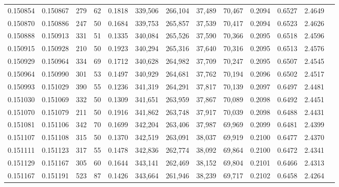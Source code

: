 \begin{tabular}{rrrrrrrrrrrrr}
0.150854 & 0.150867 &   279 &  62 &                                     0.1818 & 339,506 & 266,104 &  37,489 &  70,467 & 0.2094 & 0.6527 & 2.4649 \\
0.150870 & 0.150886 &   247 &  50 &                                     0.1684 & 339,753 & 265,857 &  37,539 &  70,417 & 0.2094 & 0.6523 & 2.4626 \\
0.150888 & 0.150913 &   331 &  51 &                                     0.1335 & 340,084 & 265,526 &  37,590 &  70,366 & 0.2095 & 0.6518 & 2.4596 \\
0.150915 & 0.150928 &   210 &  50 &                                     0.1923 & 340,294 & 265,316 &  37,640 &  70,316 & 0.2095 & 0.6513 & 2.4576 \\
0.150929 & 0.150964 &   334 &  69 &                                     0.1712 & 340,628 & 264,982 &  37,709 &  70,247 & 0.2095 & 0.6507 & 2.4545 \\
0.150964 & 0.150990 &   301 &  53 &                                     0.1497 & 340,929 & 264,681 &  37,762 &  70,194 & 0.2096 & 0.6502 & 2.4517 \\
0.150993 & 0.151029 &   390 &  55 &                                     0.1236 & 341,319 & 264,291 &  37,817 &  70,139 & 0.2097 & 0.6497 & 2.4481 \\
0.151030 & 0.151069 &   332 &  50 &                                     0.1309 & 341,651 & 263,959 &  37,867 &  70,089 & 0.2098 & 0.6492 & 2.4451 \\
0.151070 & 0.151079 &   211 &  50 &                                     0.1916 & 341,862 & 263,748 &  37,917 &  70,039 & 0.2098 & 0.6488 & 2.4431 \\
0.151081 & 0.151106 &   342 &  70 &                                     0.1699 & 342,204 & 263,406 &  37,987 &  69,969 & 0.2099 & 0.6481 & 2.4399 \\
0.151107 & 0.151108 &   315 &  50 &                                     0.1370 & 342,519 & 263,091 &  38,037 &  69,919 & 0.2100 & 0.6477 & 2.4370 \\
0.151111 & 0.151123 &   317 &  55 &                                     0.1478 & 342,836 & 262,774 &  38,092 &  69,864 & 0.2100 & 0.6472 & 2.4341 \\
0.151129 & 0.151167 &   305 &  60 &                                     0.1644 & 343,141 & 262,469 &  38,152 &  69,804 & 0.2101 & 0.6466 & 2.4313 \\
0.151167 & 0.151191 &   523 &  87 &                                     0.1426 & 343,664 & 261,946 &  38,239 &  69,717 & 0.2102 & 0.6458 & 2.4264 \\

\end{tabular}
